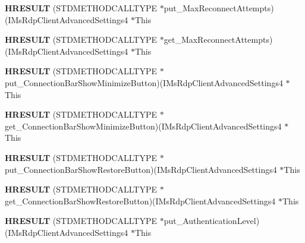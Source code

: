 \begin{DoxyCompactItemize}
{\bfseries H\+R\+E\+S\+U\+LT} (S\+T\+D\+M\+E\+T\+H\+O\+D\+C\+A\+L\+L\+T\+Y\+PE $\ast$put\+\_\+\+Max\+Reconnect\+Attempts)(I\+Ms\+Rdp\+Client\+Advanced\+Settings4 $\ast$This
\item 
\mbox{\label{struct_i_ms_rdp_client_advanced_settings4_vtbl_a9bb6cba378614b0e4c21f36c9d535a0a}} 
{\bfseries H\+R\+E\+S\+U\+LT} (S\+T\+D\+M\+E\+T\+H\+O\+D\+C\+A\+L\+L\+T\+Y\+PE $\ast$get\+\_\+\+Max\+Reconnect\+Attempts)(I\+Ms\+Rdp\+Client\+Advanced\+Settings4 $\ast$This
\item 
\mbox{\label{struct_i_ms_rdp_client_advanced_settings4_vtbl_a10d2231b34162c3552ce8eb7a5fe09c3}} 
{\bfseries H\+R\+E\+S\+U\+LT} (S\+T\+D\+M\+E\+T\+H\+O\+D\+C\+A\+L\+L\+T\+Y\+PE $\ast$put\+\_\+\+Connection\+Bar\+Show\+Minimize\+Button)(I\+Ms\+Rdp\+Client\+Advanced\+Settings4 $\ast$This
\item 
\mbox{\label{struct_i_ms_rdp_client_advanced_settings4_vtbl_a2a264bfd6df0b36f8b11aa8ebefeff4b}} 
{\bfseries H\+R\+E\+S\+U\+LT} (S\+T\+D\+M\+E\+T\+H\+O\+D\+C\+A\+L\+L\+T\+Y\+PE $\ast$get\+\_\+\+Connection\+Bar\+Show\+Minimize\+Button)(I\+Ms\+Rdp\+Client\+Advanced\+Settings4 $\ast$This
\item 
\mbox{\label{struct_i_ms_rdp_client_advanced_settings4_vtbl_ae36005a0a3c24546e694efb285e2ea60}} 
{\bfseries H\+R\+E\+S\+U\+LT} (S\+T\+D\+M\+E\+T\+H\+O\+D\+C\+A\+L\+L\+T\+Y\+PE $\ast$put\+\_\+\+Connection\+Bar\+Show\+Restore\+Button)(I\+Ms\+Rdp\+Client\+Advanced\+Settings4 $\ast$This
\item 
\mbox{\label{struct_i_ms_rdp_client_advanced_settings4_vtbl_a230b4990735bf1d4f43891c5b3fa1b02}} 
{\bfseries H\+R\+E\+S\+U\+LT} (S\+T\+D\+M\+E\+T\+H\+O\+D\+C\+A\+L\+L\+T\+Y\+PE $\ast$get\+\_\+\+Connection\+Bar\+Show\+Restore\+Button)(I\+Ms\+Rdp\+Client\+Advanced\+Settings4 $\ast$This
\item 
\mbox{\label{struct_i_ms_rdp_client_advanced_settings4_vtbl_abaaf96893911bdb2d000eef252c0f0ce}} 
{\bfseries H\+R\+E\+S\+U\+LT} (S\+T\+D\+M\+E\+T\+H\+O\+D\+C\+A\+L\+L\+T\+Y\+PE $\ast$put\+\_\+\+Authentication\+Level)(I\+Ms\+Rdp\+Client\+Advanced\+Settings4 $\ast$This

\end{DoxyCompactItemize}
